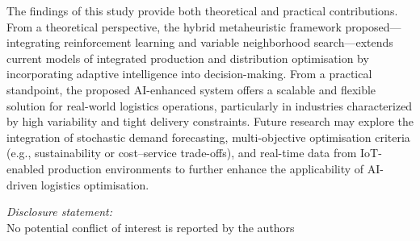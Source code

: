 \documentclass{article}
\begin{document}
The findings of this study provide both theoretical and practical contributions. From a theoretical perspective, the hybrid metaheuristic framework proposed—integrating reinforcement learning and variable neighborhood search—extends current models of integrated production and distribution optimisation by incorporating adaptive intelligence into decision-making. From a practical standpoint, the proposed AI-enhanced system offers a scalable and flexible solution for real-world logistics operations, particularly in industries characterized by high variability and tight delivery constraints. Future research may explore the integration of stochastic demand forecasting, multi-objective optimisation criteria (e.g., sustainability or cost–service trade-offs), and real-time data from IoT-enabled production environments to further enhance the applicability of AI-driven logistics optimisation.

\hfill

\textit{Disclosure statement:} \\No potential conflict of interest is reported by the authors



%
%
%




\printbibliography


\end{document}
